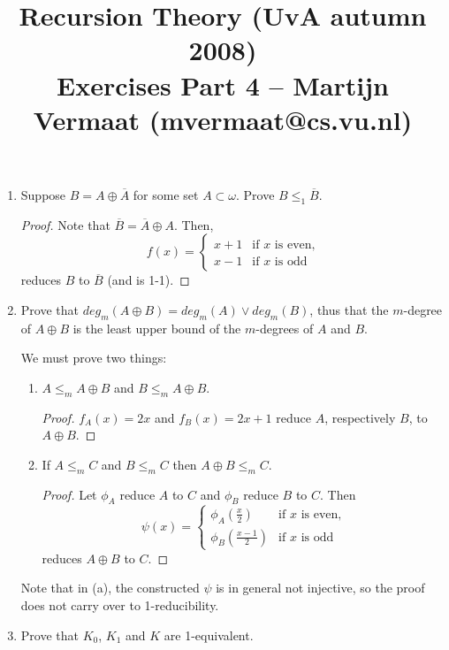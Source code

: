 \documentclass[a4paper,11pt]{article}
\title{Recursion Theory (UvA autumn 2008)\\
\normalsize{Exercises Part 4 -- Martijn Vermaat (mvermaat@cs.vu.nl)}}
\date{}
\begin{document}
\maketitle


\begin{enumerate}


\item %
Suppose $B = A \oplus \overline{A}$ for some set $A \subset \omega$. Prove $B \leq_1 \overline{B}$.

\begin{proof}
Note that $\overline{B} = \overline{A} \oplus A$. Then,
\begin{equation*}
  f(x) = \begin{cases}
    x + 1 & \text{if $x$ is even,}\\
    x - 1 & \text{if $x$ is odd}
  \end{cases}
\end{equation*}
reduces $B$ to $\overline{B}$ (and is 1-1).
\end{proof}


\item %
Prove that $deg_m(A \oplus B) = deg_m(A) \vee deg_m(B)$, thus that the $m$-degree of $A \oplus B$
is the least upper bound of the $m$-degrees of $A$ and $B$.

We must prove two things:

\begin{enumerate}
\item $A \leq_m A \oplus B$ and $B \leq_m A \oplus B$.
\begin{proof}
$f_A(x) = 2x$ and $f_B(x) = 2x + 1$ reduce $A$, respectively $B$, to $A \oplus B$.
\end{proof}

\item If $A \leq_m C$ and $B \leq_m C$ then $A \oplus B \leq_m C$.
\begin{proof}
Let $\phi_A$ reduce $A$ to $C$ and $\phi_B$ reduce $B$ to $C$. Then
\begin{equation*}
  \psi(x) = \begin{cases}
    \phi_A(\frac{x}{2})   & \text{if $x$ is even,}\\
    \phi_B(\frac{x-1}{2}) & \text{if $x$ is odd}
  \end{cases}
\end{equation*}
reduces $A \oplus B$ to $C$.
\end{proof}
\end{enumerate}
Note that in (a), the constructed $\psi$ is in general not injective, so the
proof does not carry over to 1-reducibility.


\item %
Prove that $K_0$, $K_1$ and $K$ are 1-equivalent.


\end{enumerate}
\end{document}
